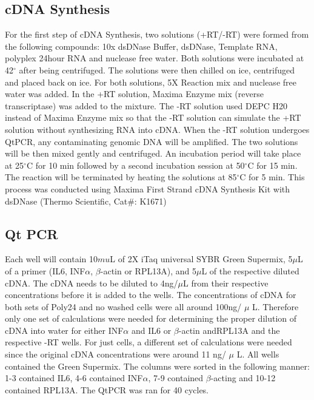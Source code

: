 \documentclass[journal, a4paper]{IEEEtran}
\begin{document}
    \subsection{cDNA Synthesis}
      For the first step of cDNA Synthesis, two solutions (+RT/-RT) were formed from the following compounds:
      10x dsDNase Buffer, dsDNase, Template RNA, polyplex 24hour RNA and nuclease free water.
      Both solutions were incubated at 42$^{\circ}$ after being centrifuged. The solutions were then chilled on ice, centrifuged and placed back on ice.
      For both solutions, 5X Reaction mix and nuclease free water was added. In the +RT solution, Maxima Enzyme mix (reverse transcriptase) was added to the mixture.
      The -RT solution used DEPC H20 instead of Maxima Enzyme mix so that the -RT solution can simulate the +RT solution without synthesizing RNA into cDNA.
      When the -RT solution undergoes QtPCR, any contaminating genomic DNA will be amplified.
      The two solutions will be then mixed gently and centrifuged. An incubation period will take place at 25$^{\circ}$C for 10 min
      followed by a second incubation session at 50$^{\circ}$C for 15 min.
      The reaction will be terminated by heating the solutions at 85$^{\circ}$C for 5 min.
      This process was conducted using Maxima First Strand cDNA Synthesis Kit with dsDNase (Thermo Scientific, Cat#: K1671)

    \subsection{Qt PCR}
      Each well will contain 10$mu$L of 2X iTaq universal SYBR Green Supermix,
      5$\mu$L of a primer (IL6, INF$\alpha$, $\beta$-actin or RPL13A),
      and 5$\mu$L of the respective diluted cDNA.
      The cDNA needs to be diluted to 4ng/$\mu$L from their respective concentrations before it is added to the wells.
      The concentrations of cDNA for both sets of Poly24 and no washed cells were all around 100ng/ $\mu$ L.
      Therefore only one set of calculations were needed for determining the proper dilution of cDNA into water
      for either INF$\alpha$ and IL6 or $\beta$-actin andRPL13A and the respective -RT wells. For just cells,
      a different set of calculations were needed since the original cDNA concentrations were around 11 ng/ $\mu$ L.
      All wells contained the Green Supermix. The columns were sorted in the following manner:
      1-3 contained IL6, 4-6 contained INF$\alpha$, 7-9 contained $\beta$-acting and 10-12 contained RPL13A.
      The QtPCR was ran for 40 cycles.
\end{document}

